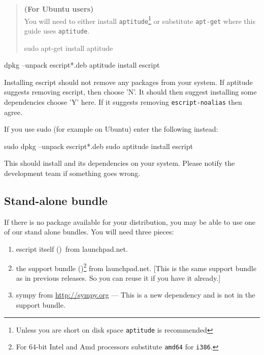\begin{verse}
\textbf{(For Ubuntu users)}\\
You will need to either install \texttt{aptitude}\footnote{Unless you are short on disk space \texttt{aptitude} is recommended} or substitute \texttt{apt-get} where this guide uses \texttt{aptitude}.
\begin{shellCode}
sudo apt-get install aptitude
\end{shellCode}
\end{verse}

\begin{shellCode}
dpkg --unpack escript*.deb
aptitude install escript
\end{shellCode}

Installing escript should not remove any packages from your system.
If aptitude suggests removing escript, then choose 'N'.
It should then suggest installing some dependencies choose 'Y' here.
If it suggests removing \texttt{escript-noalias} then agree.

If you use sudo (for example on Ubuntu) enter the following instead:
\begin{shellCode}
sudo dpkg --unpack escript*.deb
sudo aptitude install escript
\end{shellCode}

This should install \esfinley and its dependencies on your system.
Please notify the development team if something goes wrong.

\subsection{Stand-alone bundle}\label{sec:standalonelinux}

If there is no package available for your distribution, you may be able to use one of our stand alone bundles.
You will need three pieces:
\begin{enumerate}
 \item escript itself ()\footnotemark\ from launchpad.net.\addtocounter{footnote}{-1}
 \item the support bundle ()\footnote{For $64$-bit Intel and Amd processors substitute \texttt{amd64} for \texttt{i386}.} from launchpad.net.  
 [This is the same support bundle as in previous releases. So you can reuse it if you have it already.]
 \item sympy from \url{http://sympy.org} --- This is a new dependency and is not in the support bundle.
\end{enumerate}

